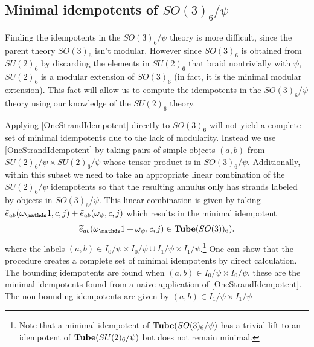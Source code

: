 \subsection{Minimal idempotents of $SO(3)_6/\psi$}

Finding the idempotents in the $SO(3)_6/\psi$ theory is more difficult, since the parent theory $SO(3)_6$ isn't modular.
However since $SO(3)_6$ is obtained from $SU(2)_6$ by discarding the elements in $SU(2)_6$ 
that braid nontrivially with $\psi$, $SU(2)_6$ is a modular extension of $SO(3)_6$ (in fact, it is the minimal modular extension). 
This fact will allow us to compute the idempotents in the $SO(3)_6/\psi$ theory using our knowledge of the $SU(2)_6$ theory. 

Applying \eqref{OneStrandIdempotent} directly to $SO(3)_6$ will not yield a complete set of minimal idempotents due to the lack of modularity. 
Instead we use  \eqref{OneStrandIdempotent} by taking pairs of simple objects $(a,b)$ from $SU(2)_6/\psi \times SU(2)_6/\psi$ whose tensor product is in $SO(3)_6/\psi$.
Additionally, within this subset we need to take an appropriate linear combination of the $SU(2)_6/\psi$ idempotents so that the resulting annulus only has strands labeled by objects in $SO(3)_6/\psi$.
This linear combination is given by taking $\tilde{e}_{ab}(\omega_\unit, c,j)+\tilde{e}_{ab}(\omega_\psi, c,j)$ which results in the minimal idempotent
\begin{align}
\widetilde{e}_{ab}( \omega_\unit + \omega_\psi,c,j) \in \tube(SO(3))_6).
\end{align}
where the labels $(a,b) \in I_0/\psi \times I_0/\psi \cup I_1/\psi \times I_1/\psi$.\footnote{
Note that a minimal idempotent of 
$\textbf{Tube}(SO(3)_6/\psi)$ has a trivial lift to an idempotent of $\textbf{Tube}(SU(2)_6/\psi)$ but does not remain minimal.}
One can show that the procedure creates a complete set of minimal idempotents by direct calculation. 
The bounding idempotents are found when $(a,b) \in I_0/\psi \times I_0/\psi$, 
these are the minimal idempotents found from a naive application of \eqref{OneStrandIdempotent}. 
The non-bounding idempotents are given by $(a,b) \in I_1/\psi \times I_1/\psi$




